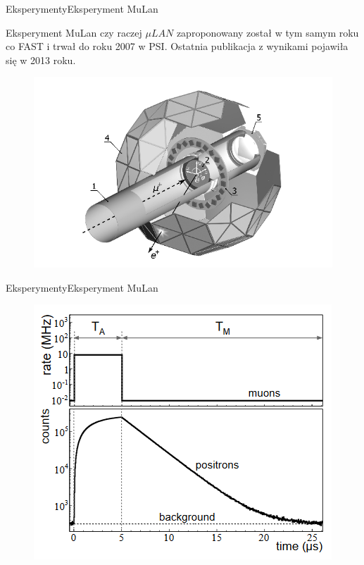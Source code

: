 \documentclass[xcolor={dvipsnames}]{beamer}
\begin{document}
\begin{frame}{Eksperymenty}{Eksperyment MuLan}
    
    Eksperyment MuLan czy raczej $\mu LAN$ zaproponowany został w tym samym roku co FAST i trwał do roku 2007 w PSI. Ostatnia publikacja z wynikami pojawiła się w 2013 roku. 

    \begin{figure}
        \includegraphics[scale=0.6]{mulan1.PNG}
    \end{figure}

\end{frame}

\begin{frame}{Eksperymenty}{Eksperyment MuLan}

    \begin{figure}
        \includegraphics[scale=1.1]{mulan2.PNG}
    \end{figure}

\end{frame}
\end{document}
